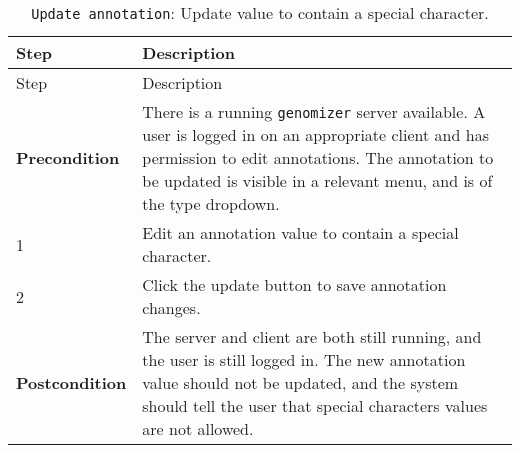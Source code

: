 \begin{longtable}[c]{@{}ll@{}}
\caption{\texttt{Update\ annotation}: Update value to contain a special
character.}\tabularnewline
\toprule
\begin{minipage}[b]{0.31\columnwidth}\raggedright\strut
Step
\strut\end{minipage} &
\begin{minipage}[b]{0.63\columnwidth}\raggedright\strut
Description
\strut\end{minipage}\tabularnewline
\midrule
\endfirsthead
\toprule
\begin{minipage}[b]{0.31\columnwidth}\raggedright\strut
Step
\strut\end{minipage} &
\begin{minipage}[b]{0.63\columnwidth}\raggedright\strut
Description
\strut\end{minipage}\tabularnewline
\midrule
\endhead
\begin{minipage}[t]{0.31\columnwidth}\raggedright\strut
\textbf{Precondition}
\strut\end{minipage} &
\begin{minipage}[t]{0.63\columnwidth}\raggedright\strut
There is a running \texttt{genomizer} server available. A user is logged
in on an appropriate client and has permission to edit annotations. The
annotation to be updated is visible in a relevant menu, and is of the
type dropdown.
\strut\end{minipage}\tabularnewline
\begin{minipage}[t]{0.31\columnwidth}\raggedright\strut
1
\strut\end{minipage} &
\begin{minipage}[t]{0.63\columnwidth}\raggedright\strut
Edit an annotation value to contain a special character.
\strut\end{minipage}\tabularnewline
\begin{minipage}[t]{0.31\columnwidth}\raggedright\strut
2
\strut\end{minipage} &
\begin{minipage}[t]{0.63\columnwidth}\raggedright\strut
Click the update button to save annotation changes.
\strut\end{minipage}\tabularnewline
\begin{minipage}[t]{0.31\columnwidth}\raggedright\strut
\textbf{Postcondition}
\strut\end{minipage} &
\begin{minipage}[t]{0.63\columnwidth}\raggedright\strut
The server and client are both still running, and the user is still
logged in. The new annotation value should not be updated, and the
system should tell the user that special characters values are not
allowed.
\strut\end{minipage}\tabularnewline
\bottomrule
\end{longtable}

